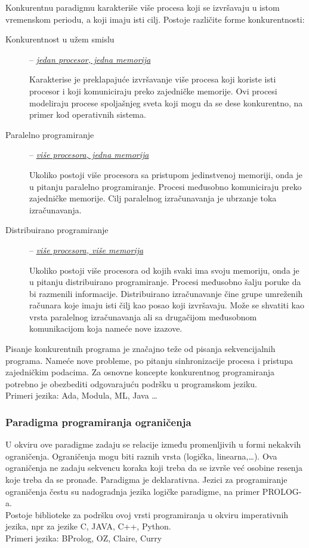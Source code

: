 \documentclass[../main.tex]{subfiles}
\begin{document}
Konkurentnu paradigmu karakteriše više procesa koji se izvršavaju u istom vremenskom periodu, a koji imaju isti cilj. Postoje različite forme konkurentnosti:
\begin{description}
	\item[Konkurentnost u užem smislu] -- \underline {\it jedan procesor, jedna memorija} \hfill

		Karakterise je preklapajuće izvršavanje više procesa koji koriste isti procesor i koji komuniciraju preko zajedničke memorije. Ovi procesi modeliraju procese spoljašnjeg sveta koji mogu da se dese konkurentno, na primer kod operativnih sistema.

	\item[Paralelno programiranje] -- \underline {\it više procesora, jedna memorija} \hfill

		Ukoliko postoji više procesora sa pristupom jedinstvenoj memoriji, onda je u pitanju paralelno programiranje. Procesi međusobno komuniciraju preko zajedničke memorije. Cilj paralelnog izračunavanja je ubrzanje toka izračunavanja.
	\item[Distribuirano programiranje] -- \underline {\it više procesora, više memorija} \hfill

		Ukoliko postoji više procesora od kojih svaki ima svoju memoriju, onda je u pitanju distribuirano programiranje. Procesi međusobno šalju poruke da bi razmenili informacije. Distribuirano izračunavanje čine grupe umreženih računara koje imaju isti čilj kao posao koji izvršavaju. Može se shvatiti kao vrsta paralelnog izračunavanja ali sa drugačijom međusobnom komunikacijom koja nameće nove izazove.
\end{description}
Pisanje konkurentnih programa je značajno teže od pisanja sekvencijalnih programa. Nameće nove probleme, po pitanju sinhronizacije procesa i pristupa zajedničkim podacima. Za osnovne koncepte konkurentnog programiranja potrebno je obezbediti odgovarajuću podršku u programskom jeziku. \\
Primeri jezika: Ada, Modula, ML, Java \ldots

\subsubsection{Paradigma programiranja ograničenja}								

U okviru ove paradigme zadaju se relacije između promenljivih u formi nekakvih ograničenja. Ograničenja mogu biti raznih vrsta (logička, linearna,\ldots). Ova ograničenja ne zadaju sekvencu koraka koji treba da se izvrše već osobine resenja koje treba da se pronađe. Paradigma je deklarativna. Jezici za programiranje ograničenja čestu su nadogradnja jezika logičke paradigme, na primer PROLOG-a.\\
Postoje biblioteke za podršku ovoj vrsti programiranja u okviru imperativnih jezika, npr za jezike C, JAVA, C++, Python.\\
Primeri jezika: BProlog, OZ, Claire, Curry
\end{document}
